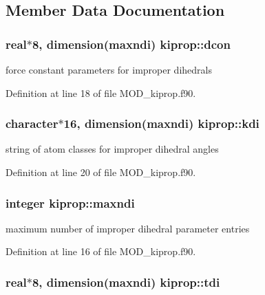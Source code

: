 \subsection{Member Data Documentation}
\hypertarget{classkiprop_a37e79afe78e774e81f1ee437155d8957}{
\subsubsection[{dcon}]{\setlength{\rightskip}{0pt plus 5cm}real$\ast$8, dimension({\bf maxndi}) kiprop\-::dcon}}\label{classkiprop_a37e79afe78e774e81f1ee437155d8957}


force constant parameters for improper dihedrals 



Definition at line 18 of file M\-O\-D\-\_\-kiprop.\-f90.

\hypertarget{classkiprop_a1bbbb58d4b6e5fd8b7dfaaa35a6b03f8}{
\subsubsection[{kdi}]{\setlength{\rightskip}{0pt plus 5cm}character$\ast$16, dimension({\bf maxndi}) kiprop\-::kdi}}\label{classkiprop_a1bbbb58d4b6e5fd8b7dfaaa35a6b03f8}


string of atom classes for improper dihedral angles 



Definition at line 20 of file M\-O\-D\-\_\-kiprop.\-f90.

\hypertarget{classkiprop_a7c337086f7a7e92eaa9d9a9eb3b740bd}{
\subsubsection[{maxndi}]{\setlength{\rightskip}{0pt plus 5cm}integer kiprop\-::maxndi}}\label{classkiprop_a7c337086f7a7e92eaa9d9a9eb3b740bd}


maximum number of improper dihedral parameter entries 



Definition at line 16 of file M\-O\-D\-\_\-kiprop.\-f90.

\hypertarget{classkiprop_a2f3ca3785e86b7c9e293b908a977af8d}{
\subsubsection[{tdi}]{\setlength{\rightskip}{0pt plus 5cm}real$\ast$8, dimension({\bf maxndi}) kiprop\-::tdi}}\label{classkiprop_a2f3ca3785e86b7c9e293b908a977af8d}



